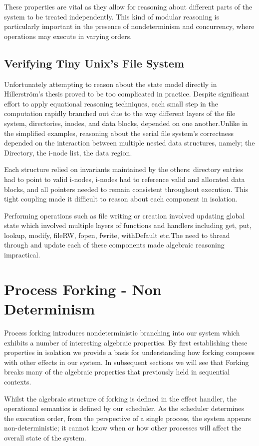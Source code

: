\documentclass[logo,bsc,singlespacing,parskip]{infthesis}
\begin{document}
These properties are vital as they allow for reasoning about different parts of the system to be treated independently. This kind of modular reasoning is particularly important in the presence of nondeterminism and concurrency, where operations may execute in varying orders.


\subsection{Verifying Tiny Unix's File System}
Unfortunately attempting to reason about the state model directly in Hillerström's thesis proved to be too complicated in practice. Despite significant effort to apply equational reasoning techniques, each small step in the computation rapidly branched out due to the way different layers of the file system, directories, inodes, and data blocks, depended on one another.Unlike in the simplified examples, reasoning about the serial file system's correctness depended on the interaction between multiple nested data structures, namely; the Directory, the i-node list, the data region. 

Each structure relied on invariants maintained by the others: directory entries had to point to valid i-nodes, i-nodes had to reference valid and allocated data blocks, and all pointers needed to remain consistent throughout execution. This tight coupling made it difficult to reason about each component in isolation.

Performing operations such as file writing or creation involved updating global state which involved multiple layers of functions and handlers including get, put, lookup, modify, fileRW, fopen, fwrite, withDefault etc.The need to thread through and update each of these components made algebraic reasoning impractical.


\section{Process Forking - Non Determinism}

Process forking introduces nondeterministic branching into our system which exhibits a number of interesting algebraic properties. By first establishing these properties in isolation we provide a basis for understanding how forking composes with other effects in our system. In subsequent sections we will see that Forking breaks many of the algebraic properties that previously held in sequential contexts.

Whilst the algebraic structure of forking is defined in the effect handler, the operational semantics is defined by our scheduler. As the scheduler determines the execution order, from the perspective of a single process, the system appears non-deterministic; it cannot know when or how other processes will affect the overall state of the system.
\end{document}
